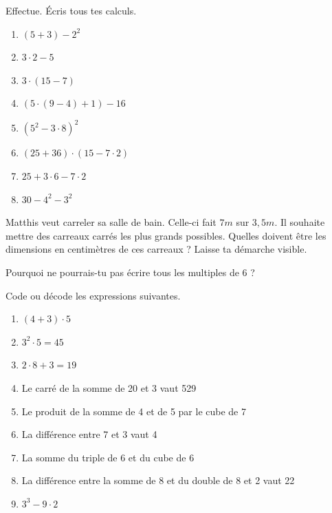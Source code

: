 \documentclass[../../syllabus_1.tex]{subfiles}
\begin{document}
\begin{exercise}
      Effectue. Écris tous tes calculs.
      \begin{enumerate}[cols=2]
            \item $\left(5+3\right) - 2^2$
            \item $3\cdot 2 -5$
            \item $3\cdot \left(15-7\right)$
            \item $\left(5\cdot\left(9-4\right)+1\right)-16$
            \item $\left(5^2-3\cdot8\right)^2$
            \item $\left(25+36\right) \cdot \left(15-7\cdot2\right)$
            \item $25+3\cdot 6 - 7 \cdot 2$
            \item $30 - 4^2 - 3^2$
      \end{enumerate}
\end{exercise}

\begin{exercise}
      Matthis veut carreler sa salle de bain. Celle-ci fait \(7m\) sur \(3,5m\). Il souhaite mettre des carreaux carrés les plus grands possibles. Quelles doivent être les dimensions en centimètres de ces carreaux ? Laisse ta démarche visible.
\end{exercise}

\begin{exercise}
      Pourquoi ne pourrais-tu pas écrire tous les multiples de 6 ?
\end{exercise}

\begin{exercise}
      Code ou décode les expressions suivantes.
      \begin{enumerate}
            \item $\left(4+3\right)\cdot5$
            \item $3^2 \cdot 5 = 45$
            \item $2\cdot 8 +3 = 19$
            \item Le carré de la somme de 20 et 3 vaut 529
            \item Le produit de la somme de 4 et de 5 par le cube de 7
            \item La différence entre 7 et 3 vaut 4
            \item La somme du triple de 6 et du cube de 6
            \item La différence entre la somme de 8 et du double de 8 et 2 vaut 22
            \item $3^3 - 9 \cdot 2$
      \end{enumerate}
\end{exercise}
\end{document}
